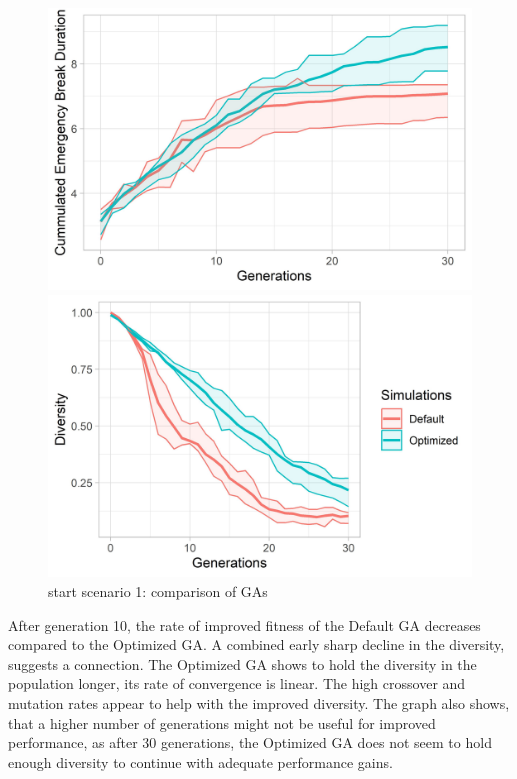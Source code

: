 \begin{figure}[ht] 
	\begin{minipage}[b]{0.5\linewidth}
		\centering
		\includegraphics[width=1\linewidth]{simulations/evaluation/plots/sim_1_ga_generations} 
	\end{minipage}%
	\begin{minipage}[b]{0.5\linewidth}
		\centering
		\includegraphics[width=1\linewidth]{simulations/evaluation/plots/sim_1_ga_diversity} 
	\end{minipage} 
	\caption{start scenario 1: comparison of GAs}
	\label{fig:evaluation:sim_1_ga_comparison}
\end{figure}

After generation 10, the rate of improved fitness of the Default GA decreases compared to the Optimized GA. A combined early sharp decline in the diversity, suggests a connection. The Optimized GA shows to hold the diversity in the population longer, its rate of convergence is linear. The high crossover and mutation rates appear to help with the improved diversity. The graph also shows, that a higher number of generations might not be useful for improved performance, as after 30 generations, the Optimized GA does not seem to hold enough diversity to continue with adequate performance gains. 

